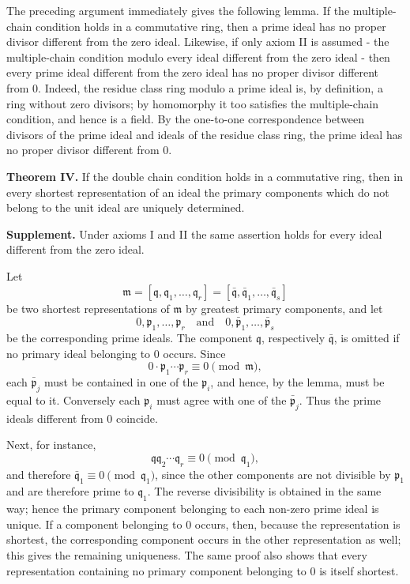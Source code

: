 \documentclass[11pt]{article}
\begin{document}
The preceding argument immediately gives the following lemma. If the
multiple-chain condition holds in a commutative ring, then a prime ideal
has no proper divisor different from the zero ideal. Likewise, if only
axiom II is assumed - the multiple-chain condition modulo every ideal
different from the zero ideal - then every prime ideal different from
the zero ideal has no proper divisor different from \(0\). Indeed, the
residue class ring modulo a prime ideal is, by definition, a ring
without zero divisors; by homomorphy it too satisfies the multiple-chain
condition, and hence is a field. By the one-to-one correspondence
between divisors of the prime ideal and ideals of the residue class
ring, the prime ideal has no proper divisor different from \(0\).

\textbf{Theorem IV.} If the double chain condition holds in a
commutative ring, then in every shortest representation of an ideal the
primary components which do not belong to the unit ideal are uniquely
determined.

\textbf{Supplement.} Under axioms I and II the same assertion holds for
every ideal different from the zero ideal.

Let \[
  \mathfrak m=[\mathfrak q,\mathfrak q_1,\ldots,\mathfrak q_r]
      =[\bar{\mathfrak q},\bar{\mathfrak q}_1,\ldots,\bar{\mathfrak q}_s]
\] be two shortest representations of \(\mathfrak m\) by greatest
primary components, and let \[
  0,\mathfrak p_1,\ldots,\mathfrak p_r
  \quad\text{and}\quad
  0,\bar{\mathfrak p}_1,\ldots,\bar{\mathfrak p}_s
\] be the corresponding prime ideals. The component \(\mathfrak q\),
respectively \(\bar{\mathfrak q}\), is omitted if no primary ideal
belonging to \(0\) occurs. Since \[
  0\cdot \mathfrak p_1\cdots\mathfrak p_r\equiv0\pmod{\mathfrak m},
\] each \(\bar{\mathfrak p}_j\) must be contained in one of the
\(\mathfrak p_i\), and hence, by the lemma, must be equal to it.
Conversely each \(\mathfrak p_i\) must agree with one of the
\(\bar{\mathfrak p}_j\). Thus the prime ideals different from \(0\)
coincide.

Next, for instance, \[
  \mathfrak q\mathfrak q_2
\cdots \mathfrak q_r\equiv0\pmod{\mathfrak q_1},
\] and therefore \(\bar{\mathfrak q}_1\equiv0\pmod{\mathfrak q_1}\),
since the other components are not divisible by \(\mathfrak p_1\) and
are therefore prime to \(\mathfrak q_1\). The reverse divisibility is
obtained in the same way; hence the primary component belonging to each
non-zero prime ideal is unique. If a component belonging to \(0\)
occurs, then, because the representation is shortest, the corresponding
component occurs in the other representation as well; this gives the
remaining uniqueness. The same proof also shows that every
representation containing no primary component belonging to \(0\) is
itself shortest.
\end{document}
